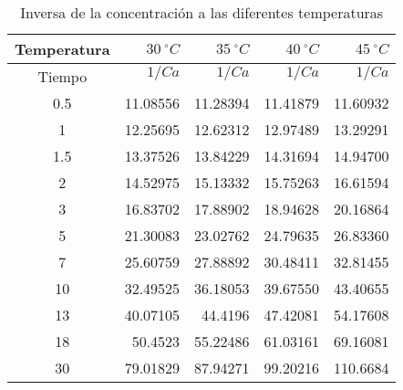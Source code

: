 \begin{table}[H]
    \centering
    \begin{tabular}{crrrr}
        \hline

        \multicolumn{1}{l}{Temperatura} & $30\: ^{\circ} C$    & $35\: ^{\circ} C$    & $40\: ^{\circ} C$    & $45\: ^{\circ} C$ \\ \hline 
        \multicolumn{1}{c}{\multirow{2}[0]{*}{Tiempo}} & \multicolumn{1}{p{4.5em}}{$1/Ca$} & \multicolumn{1}{p{5.78em}}{$1/Ca$} & \multicolumn{1}{p{6em}}{$1/Ca$} & \multicolumn{1}{p{5.39em}}{$1/Ca$} \\ 
              &       &       &       &  \\ \hline
        0.5   & 11.08556 & 11.28394 & 11.41879 & 11.60932 \\
        1     & 12.25695 & 12.62312 & 12.97489 & 13.29291 \\
        1.5   & 13.37526 & 13.84229 & 14.31694 & 14.94700 \\
        2     & 14.52975 & 15.13332 & 15.75263 & 16.61594 \\
        3     & 16.83702 & 17.88902 & 18.94628 & 20.16864 \\
        5     & 21.30083 & 23.02762 & 24.79635 & 26.83360 \\
        7     & 25.60759 & 27.88892 & 30.48411 & 32.81455 \\
        10    & 32.49525 & 36.18053 & 39.67550 & 43.40655 \\
        13    & 40.07105 & 44.4196  & 47.42081 & 54.17608 \\
        18    & 50.4523  & 55.22486 & 61.03161 & 69.16081 \\
        30    & 79.01829 & 87.94271 & 99.20216 & 110.6684 \\ 
        \hline
        
        \end{tabular}
    \caption{Inversa de la concentración a las diferentes temperaturas}
    \label{tab:inversa_concentracion}
  \end{table}%
  